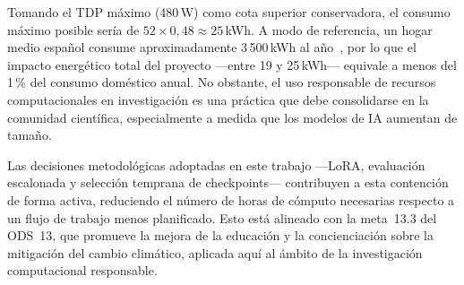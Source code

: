 \documentclass[%
    school=etsisi,%
    type=pfg,%
    degree=61CD,%
]{upm-report}
\begin{document}
Tomando el TDP m\'aximo (480\,W) como cota superior conservadora, el consumo m\'aximo posible ser\'ia de $52 \times 0{,}48 \approx 25$\,kWh. A modo de referencia, un hogar medio espa\~nol consume aproximadamente 3\,500\,kWh al a\~no~\cite{idae2023consumo}, por lo que el impacto energ\'etico total del proyecto ---entre 19 y 25\,kWh--- equivale a menos del 1\,\% del consumo dom\'estico anual. No obstante, el uso responsable de recursos computacionales en investigaci\'on es una pr\'actica que debe consolidarse en la comunidad cient\'ifica, especialmente a medida que los modelos de IA aumentan de tama\~no.

Las decisiones metodol\'ogicas adoptadas en este trabajo ---LoRA, evaluaci\'on escalonada y selecci\'on temprana de checkpoints--- contribuyen a esta contenci\'on de forma activa, reduciendo el n\'umero de horas de c\'omputo necesarias respecto a un flujo de trabajo menos planificado. Esto est\'a alineado con la meta~13.3 del ODS~13, que promueve la mejora de la educaci\'on y la concienciaci\'on sobre la mitigaci\'on del cambio clim\'atico, aplicada aqu\'i al \'ambito de la investigaci\'on computacional responsable.
\end{document}
